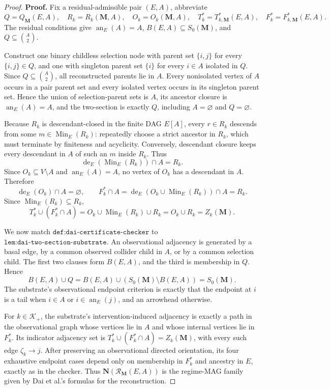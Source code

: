 \documentclass{article}
\begin{document}
\begin{proof}
\textbf{Proof.}
Fix a residual-admissible pair \((E,A)\), abbreviate
\[
Q=Q_{\mathbf M}(E,A),
\quad R_k=R_k(\mathbf M,A),
\quad O_k=O_k(\mathbf M,A),
\quad T_k^*=T^*_{k,\mathbf M}(E,A),
\quad F_k^*=F^*_{k,\mathbf M}(E,A).
\]
The residual conditions give \(\operatorname{an}_E(A)=A\), \(B(E,A)\subseteq S_0(\mathbf M)\), and \(Q\subseteq\binom A2\).

Construct one binary childless selection node with parent set \(\{i,j\}\) for every \(\{i,j\}\in Q\), and one with singleton parent set \(\{i\}\) for every \(i\in A\) isolated in \(Q\).  Since \(Q\subseteq\binom A2\), all reconstructed parents lie in \(A\).  Every nonisolated vertex of \(A\) occurs in a pair parent set and every isolated vertex occurs in its singleton parent set.  Hence the union of selection-parent sets is \(A\), its ancestor closure is \(\operatorname{an}_E(A)=A\), and the two-section is exactly \(Q\), including \(A=\varnothing\) and \(Q=\varnothing\).

Because \(R_k\) is descendant-closed in the finite DAG \(E[A]\), every \(r\in R_k\) descends from some \(m\in\operatorname{Min}_E(R_k)\): repeatedly choose a strict ancestor in \(R_k\), which must terminate by finiteness and acyclicity.  Conversely, descendant closure keeps every descendant in \(A\) of such an \(m\) inside \(R_k\).  Thus
\[
\operatorname{de}_E(\operatorname{Min}_E(R_k))\cap A=R_k.
\]
Since \(O_k\subseteq V\setminus A\) and \(\operatorname{an}_E(A)=A\), no vertex of \(O_k\) has a descendant in \(A\).  Therefore
\[
\operatorname{de}_E(O_k)\cap A=\varnothing,
\qquad
F_k^*\cap A
=\operatorname{de}_E(O_k\cup\operatorname{Min}_E(R_k))\cap A
=R_k.
\]
Since \(\operatorname{Min}_E(R_k)\subseteq R_k\),
\[
T_k^*\cup(F_k^*\cap A)
=O_k\cup\operatorname{Min}_E(R_k)\cup R_k
=O_k\cup R_k
=Z_k(\mathbf M).
\]

We now match \(\texttt{def:dai-certificate-checker}\) to \(\texttt{lem:dai-two-section-substrate}\).  An observational adjacency is generated by a basal edge, by a common observed collider child in \(A\), or by a common selection child.  The first two clauses form \(B(E,A)\), and the third is membership in \(Q\).  Hence
\[
B(E,A)\cup Q
=B(E,A)\cup(S_0(\mathbf M)\setminus B(E,A))
=S_0(\mathbf M).
\]
The substrate's observational endpoint criterion is exactly that the endpoint at \(i\) is a tail when \(i\in A\) or \(i\in\operatorname{an}_E(j)\), and an arrowhead otherwise.

For \(k\in\mathcal K_+\), the substrate's intervention-induced adjacency is exactly a path in the observational graph whose vertices lie in \(A\) and whose internal vertices lie in \(F_k^*\).  Its indicator adjacency set is \(T_k^*\cup(F_k^*\cap A)=Z_k(\mathbf M)\), with every such edge \(\zeta_k\to j\).  After preserving an observational directed orientation, its four exhaustive endpoint cases depend only on membership in \(F_k^*\) and ancestry in \(E\), exactly as in the checker.  Thus \(\mathbf N(\mathcal R_{\mathbf M}(E,A))\) is the regime-MAG family given by Dai et al.'s formulas for the reconstruction.


\end{proof}
\end{document}
